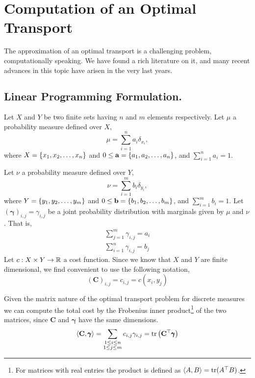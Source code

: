 \chapter{Computation of an Optimal Transport}
The approximation of an optimal transport is a challenging problem, computationally speaking. We have found a rich literature on it, and many recent advances in this topic have arisen in the very last years. 
\section{Linear Programming Formulation.}
Let $X$ and $Y$ be two finite sets having $n$ and $m$ elements respectively. Let $\mu$ a probability measure defined over $X$,
\begin{equation}
	\mu=\sum_{i=1}^{n} a_i \delta_{x_i},
\end{equation} 
where $X=\left\lbrace x_1, x_2, \dots, x_n \right\rbrace$ and $0\leq\mathbf{a}=\left\lbrace a_1, a_2, \dots, a_n \right\rbrace$, and $\sum_{i=1}^{n}a_i=1$.

Let $\nu$ a probability measure defined over $Y$,
\begin{equation}
	\nu=\sum_{i=1}^{m} b_i \delta_{y_i},
\end{equation}
where $Y=\left\lbrace y_1, y_2, \dots, y_m \right\rbrace$ and $0\leq\mathbf{b}=\left\lbrace b_1, b_2, \dots, b_m \right\rbrace$, and $\sum_{i=1}^{m}b_i=1$. 
Let $(\pmb{\gamma})_{i,j}=\gamma_{i,j}$ be a joint probability distribution with marginals given by $\mu$ and $\nu$. That is,
\begin{align}
	\sum_{j=1}^{m}\gamma_{i,j}=a_i\\ \sum_{i=1}^{n}\gamma_{i,j}=b_j
\end{align}
Let $c:X\times Y \rightarrow \mathbb{R}$ a cost function. Since we know that $X$ and $Y$ are finite dimensional, we find convenient to use the following notation,
\begin{equation}
	(\mathbf C)_{i,j}=c_{i,j}=c(x_i, y_j)
\end{equation}

Given the matrix nature of the optimal transport problem for discrete measures we can compute the total cost by the Frobenius inner product\footnote{For matrices with real entries the product is defined as $\left\langle A, B \right\rangle=\mathrm{tr}(A^\top B)$.} of the two matrices, since $\mathbf{C}$ and $\pmb{\gamma}$ have the same dimensions.
\begin{equation}
	\left\langle \mathbf{C}, \pmb{\gamma} \right\rangle=\sum_{\substack{1\leq i \leq n \\ 1\leq j\leq m}}c_{i,j}\gamma_{i,j}=\mathrm{tr}\left( \mathbf{C}^\top\pmb{\gamma} \right)
\end{equation}
